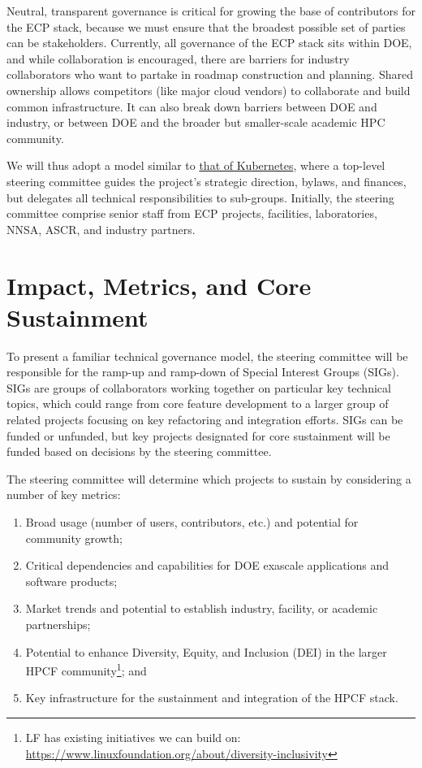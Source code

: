 \documentclass[11pt]{article}
\begin{document}
Neutral, transparent governance is critical for growing the base of contributors for the
ECP stack, because we must ensure that the broadest possible set of parties can be
stakeholders. Currently, all governance of the ECP stack sits within DOE, and while
collaboration is encouraged, there are barriers for industry collaborators who want to
partake in roadmap construction and planning. Shared ownership allows competitors (like
major cloud vendors) to collaborate and build common infrastructure. It can also break
down barriers between DOE and industry, or between DOE and the broader but smaller-scale
academic HPC community.

We will thus adopt a model similar to
\href{https://github.com/kubernetes/steering/blob/main/charter.md}{that of Kubernetes},
where a top-level steering committee guides the project's strategic direction, bylaws,
and finances, but delegates all technical responsibilities to sub-groups. Initially, the
steering committee comprise senior staff from ECP projects, facilities, laboratories,
NNSA, ASCR, and industry partners.

\section{Impact, Metrics, and Core Sustainment}

To present a familiar technical governance model, the steering committee will be
responsible for the ramp-up and ramp-down of Special Interest Groups (SIGs). SIGs are
groups of collaborators working together on particular key technical topics, which could
range from core feature development to a larger group of related projects focusing on
key refactoring and integration efforts. SIGs can be funded or unfunded, but key
projects designated for core sustainment will be funded based on decisions by the
steering committee.

The steering committee will determine which projects to sustain by considering a number
of key metrics:

\begin{enumerate}
\item Broad usage (number of users, contributors, etc.) and potential for community
  growth;
\item Critical dependencies and capabilities for DOE exascale applications and software
  products;
\item Market trends and potential to establish industry, facility, or academic
  partnerships;
\item Potential to enhance Diversity, Equity, and Inclusion (DEI) in the larger HPCF
  community\footnote{LF has existing initiatives we can build on:
  \href{https://www.linuxfoundation.org/about/diversity-inclusivity}{https://www.linuxfoundation.org/about/diversity-inclusivity}};
  and
\item Key infrastructure for the sustainment and integration of the HPCF stack.
\end{enumerate}
\end{document}
